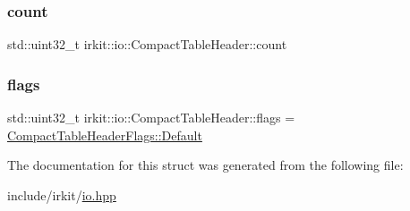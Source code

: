 \subsubsection{\texorpdfstring{count}{count}}
{\footnotesize\ttfamily std\+::uint32\+\_\+t irkit\+::io\+::\+Compact\+Table\+Header\+::count}

\mbox{\label{structirkit_1_1io_1_1CompactTableHeader_a5b8e81c7a83231d3e9f7770527268bea}} 
\subsubsection{\texorpdfstring{flags}{flags}}
{\footnotesize\ttfamily std\+::uint32\+\_\+t irkit\+::io\+::\+Compact\+Table\+Header\+::flags = \mbox{\hyperlink{structirkit_1_1io_1_1CompactTableHeaderFlags_a30800f23eaeacbde50aeaef0f4786822}{Compact\+Table\+Header\+Flags\+::\+Default}}}



The documentation for this struct was generated from the following file\+:\begin{DoxyCompactItemize}
\item 
include/irkit/\mbox{\hyperlink{io_8hpp}{io.\+hpp}}\end{DoxyCompactItemize}
